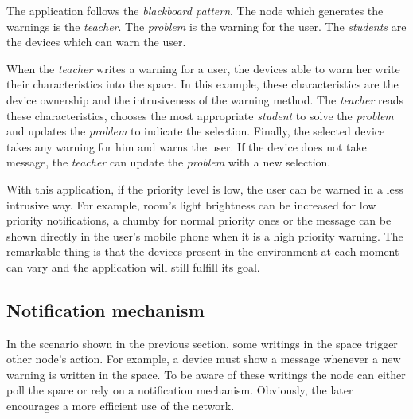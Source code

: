 The application follows the \emph{blackboard pattern}.
The node which generates the warnings is the \emph{teacher}.
The \emph{problem} is the warning for the user.
The \emph{students} are the devices which can warn the user.


When the \emph{teacher} writes a warning for a user, the devices able to warn her write their characteristics into the space.
In this example, these characteristics are the device ownership and the intrusiveness of the warning method.
The \emph{teacher} reads these characteristics, chooses the most appropriate \emph{student} to solve the \emph{problem} and updates the \emph{problem} to indicate the selection.
Finally, the selected device takes any warning for him and warns the user. %
If the device does not take message, the \emph{teacher} can update the \emph{problem} with a new selection.


With this application, if the priority level is low, the user can be warned in a less intrusive way.
For example, room's light brightness can be increased for low priority notifications, a chumby for normal priority ones or the message can be shown directly in the user's mobile phone when it is a high priority warning.
The remarkable thing is that the devices present in the environment at each moment can vary and the application will still fulfill its goal.





\subsection{Notification mechanism}
\label{sec:notification}


In the scenario shown in the previous section, some writings in the space trigger other node's action.
For example, a device must show a message whenever a new warning is written in the space. %
To be aware of these writings the node can either poll the space or rely on a notification mechanism. %
Obviously, the later encourages a more efficient use of the network. %


